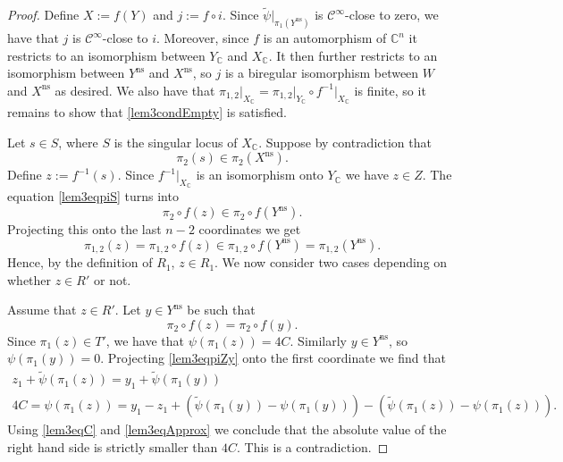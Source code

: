 \documentclass{amsart}
\theoremstyle{plain}
\theoremstyle{definition}
\theoremstyle{remark}
\numberwithin{equation}{thm} %
\newcommand{\C}{\mathbb{C}}
\newcommand{\ns}{\mathrm{ns}}
\begin{document}
\begin{proof}
Define $X:=f(Y)$ and $j:=f\circ i$. Since $\tilde \psi\vert_{\pi_1(Y^\ns)}$ is $\mathcal C^\infty$-close to zero, we have that $j$ is $\mathcal C^\infty$-close to $i$. Moreover, since $f$ is an automorphism of $\C^n$ it restricts to an isomorphism between $Y_\C$ and $X_\C$. It then further restricts to an isomorphism between $Y^\ns$ and $X^\ns$, so $j$ is a biregular isomorphism between $W$ and $X^\ns$ as desired. We also have that $\pi_{1,2}\vert_{X_\C}=\pi_{1,2}\vert_{Y_\C}\circ f^{-1}\vert_{X_\C}$ is finite, so it remains to show that \eqref{lem3condEmpty} is satisfied.

Let $s\in S$, where $S$ is the singular locus of $X_\C$. Suppose by contradiction that
\begin{equation}\label{lem3eqpiS}
    \pi_2(s)\in \pi_2(X^\ns).
\end{equation}
Define $z:=f^{-1}(s)$. Since $f^{-1}\vert_{X_\C}$ is an isomorphism onto $Y_\C$ we have $z\in Z$. The equation \eqref{lem3eqpiS} turns into 
\begin{equation}\label{lem3eqpiZ}
    \pi_2\circ f(z)\in \pi_2\circ f(Y^\ns).
\end{equation}
Projecting this onto the last $n-2$ coordinates we get
\begin{equation*}
    \pi_{1,2}(z)=\pi_{1,2}\circ f(z)\in \pi_{1,2}\circ f(Y^\ns)=\pi_{1,2}(Y^\ns).
\end{equation*}
Hence, by the definition of $R_1$, $z\in R_1$. We now consider two cases depending on whether $z\in R'$ or not. 

Assume that $z\in R'$. Let $y\in Y^\ns$ be such that 
\begin{equation}\label{lem3eqpiZy}
    \pi_2\circ f(z)= \pi_2\circ f(y).
\end{equation}
Since $\pi_1(z)\in T'$, we have that $\psi(\pi_1(z))=4C$. Similarly $y\in Y^\ns$, so $\psi(\pi_1(y))=0$. Projecting \eqref{lem3eqpiZy} onto the first coordinate we find that
\begin{gather*}
    z_1+\tilde \psi(\pi_1(z))=y_1+\tilde \psi(\pi_1(y))\\
    4C=\psi(\pi_1(z))= y_1-z_1+\left(\tilde \psi(\pi_1(y))-\psi(\pi_1(y))\right)-\left(\tilde \psi(\pi_1(z))-\psi(\pi_1(z))\right).
\end{gather*}
Using \eqref{lem3eqC} and \eqref{lem3eqApprox} we conclude that the absolute value of the right hand side is strictly smaller than $4C$. This is a contradiction.


\end{proof}
\end{document}
